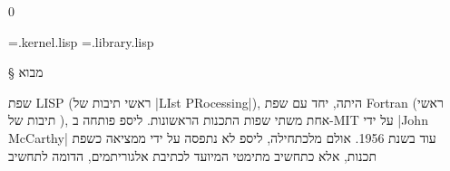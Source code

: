 
\def\CPL{\E|C|\xspace}

\setcounter{library}0

\newread \tempFile %
\newwrite {} %
\newwrite \libraryFile %
\immediate \openout {}=\jobname.kernel.lisp
\immediate \openout \libraryFile=\jobname.library.lisp

\newenvironment{KERNEL}{%
  \stepcounter{kernel}
  \def\fileName{\jobname.kernel.\arabic{kernel}.lisp}%
  \csname filecontents*\endcsname[overwrite]{\fileName}%
}{%
  \csname endfilecontents*\endcsname%
  \LTR
  \endLTR
  \openin \tempFile=\fileName
  \begingroup\endlinechar=-1
  \loop\unless\ifeof \tempFile
    \read\tempFile to\fileline %
    \immediate\write \kernelFile
    {\unexpanded\expandafter{\fileline}}
  \repeat
  \endgroup
  \closein \tempFile
}

\newenvironment{LIBRARY}{%
  \stepcounter{library}
  \def\fileName{\jobname.library.\arabic{library}.lisp}%
  \csname filecontents*\endcsname[overwrite]{\fileName}%
}{%
  \csname endfilecontents*\endcsname%
  \LTR
  \endLTR
  \newread \tempFile %
  \openin \tempFile=\fileName
  \begingroup\endlinechar=-1
  \loop\unless\ifeof \tempFile
    \read\tempFile to\fileline %
    \immediate\write \libraryFile
    {\unexpanded\expandafter{\fileline}} %
  \repeat
  \endgroup
  \closein \tempFile
}

%
§ מבוא

שפת LISP (ראשי תיבות של \E|LIst PRocessing|), היתה, יחד עם שפת Fortran (ראשי
תיבות של ), אחת משתי שפות התכנות הראשונות. ליספ פותחה
ב-MIT על ידי \E|John McCarthy| עוד בשנת 1956. אולם מלכתחילה, ליספ לא נתפסה על
ידי ממציאה כשפת תכנות, אלא כתחשיב מתימטי המיועד לכתיבת אלגוריתמים, הדומה לתחשיב

